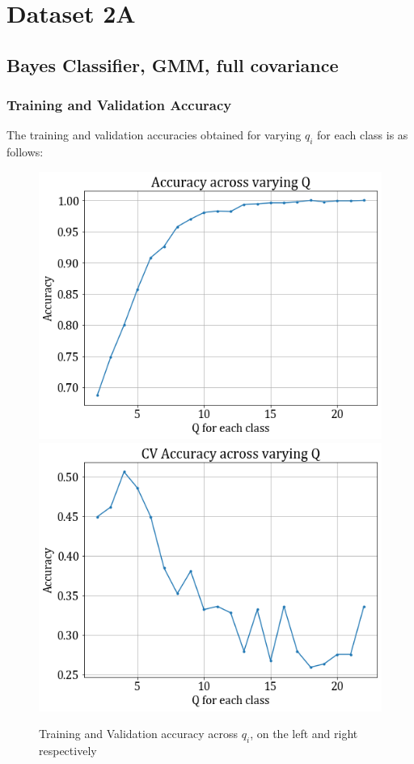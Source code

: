 \documentclass[11pt,a4paper]{article}
\begin{document}
\break
\section{Dataset 2A}
\subsection{Bayes Classifier, GMM, full covariance}
\subsubsection{Training and Validation Accuracy}
The training and validation accuracies obtained for varying $q_i$ for each class is as follows:
\begin{figure}[H]
    \hspace{-2em}
    \includegraphics[scale=0.5]{images/2a_full_train_acc.png}
    \includegraphics[scale=0.5]{images/2a_full_val_acc.png}
    \caption{Training and Validation accuracy across $q_i$, on the left and right respectively}
\end{figure}
\end{document}
